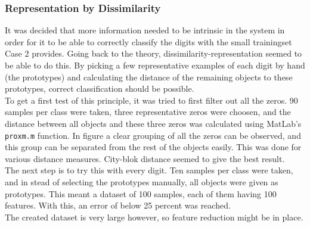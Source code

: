 \subsubsection*{Representation by Dissimilarity}
It was decided that more information needed to be intrinsic in the system in order for it to be able to correctly classify the digits with the small trainingset Case 2 provides. Going back to the theory, dissimilarity-representation seemed to be able to do this. By picking a few representative examples of each digit by hand (the prototypes) and calculating the distance of the remaining objects to these prototypes, correct classification should be possible. \\
\noindent To get a first test of this principle, it was tried to first filter out all the zeros. 90 samples per class were taken, three representative zeros were choosen, and the distance between all objects and these three zeros was calculated using MatLab's \texttt{proxm.m} function.  In figure  a clear grouping of all the zeros can be observed, and this group can be separated from the rest of the objects easily. This was done for various distance measures. City-blok distance seemed to give the best result.  \\
\noindent The next step is to try this with every digit. Ten samples per class were taken, and in stead of selecting the prototypes manually, all objects were given as prototypes. This meant a dataset of 100 samples, each of them having 100 features. With this, an error of below 25 percent was reached.  \\
\noindent The created dataset is very large however, so feature reduction might be in place. 
